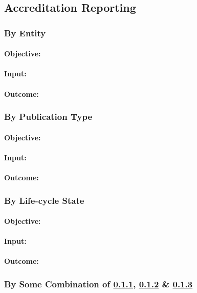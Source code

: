 \subsection{Accreditation Reporting}
\subsubsection{By Entity} \label{ti_ar_entity}
\paragraph{Objective:}
\paragraph{Input:}
\paragraph{Outcome:}
\subsubsection{By Publication Type} \label{ti_ar_pubtype}
\paragraph{Objective:}
\paragraph{Input:}
\paragraph{Outcome:}
\subsubsection{By Life-cycle State} \label{ti_ar_lcs}
\paragraph{Objective:}
\paragraph{Input:}
\paragraph{Outcome:}
\subsubsection{By Some Combination of \ref{ti_ar_entity}, \ref{ti_ar_pubtype} \& \ref{ti_ar_lcs}}
